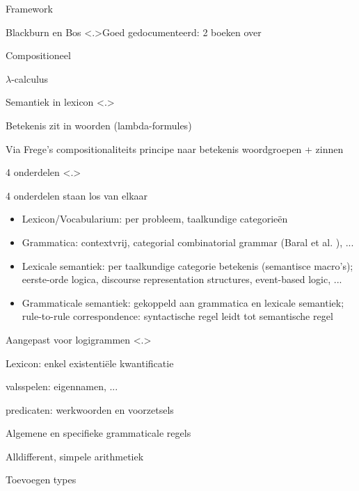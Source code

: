 \documentclass[notes, dvipsnames]{beamer}
\newcommand{\seperation}{
	\vspace{1em}
	\ppause
}
\newcommand{\hitem}{
	\ppause
	\item
}
\newcommand{\ppause}{\onslide<+>}
\newcommand{\nnote}[1]{\note<.>{#1}}
\begin{document}
	\begin{frame}{Framework}
		\begin{itemize}
      \hitem Blackburn en Bos \cite{Blackburn2005, Blackburn2006}
      \nnote{Goed gedocumenteerd: 2 boeken over}

      \seperation
      \item Compositioneel
      \item $\lambda$-calculus
      \item Semantiek in lexicon
      \nnote{
        Betekenis zit in woorden (lambda-formules)
        \item Via Frege's compositionaliteits principe naar betekenis woordgroepen + zinnen
      }
      \hitem 4 onderdelen
      \nnote{
        4 onderdelen staan los van elkaar
        \begin{itemize}
          \item Lexicon/Vocabularium: per probleem, taalkundige categorieën
          \item Grammatica: contextvrij, categorial combinatorial grammar (Baral et al. \cite{Baral2008}), ...
          \item Lexicale semantiek: per taalkundige categorie betekenis (semantisce macro's); eerste-orde logica, discourse representation structures, event-based logic, ...
          \item Grammaticale semantiek: gekoppeld aan grammatica en lexicale semantiek; rule-to-rule correspondence: syntactische regel leidt tot semantische regel
        \end{itemize}
      }

      \seperation
      \item Aangepast voor logigrammen
      \nnote{
        \item Lexicon: enkel existentiële kwantificatie
        \item valsspelen: eigennamen, ...
        \item predicaten: werkwoorden en voorzetsels
        \item Algemene en specifieke grammaticale regels
        \item Alldifferent, simpele arithmetiek
        \item Toevoegen types
      }
		\end{itemize}
	\end{frame}
\end{document}
